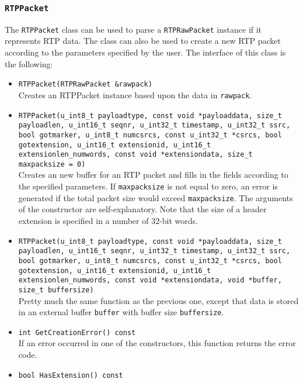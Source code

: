 \documentclass[12pt,a4paper]{article}
\newcommand{\headerfile}[1]{\marginpar{\scriptsize Header:\\{\tt #1}}}
\begin{document}
			\subsubsection{\tt RTPPacket}\headerfile{rtppacket.h}
	
				The {\tt RTPPacket} class can be used to parse a {\tt RTPRawPacket}
				instance if it represents RTP data. The class can also be used to
				create a new RTP packet according to the parameters specified by
				the user. The interface of this class is the following:
				\begin{itemize}
					\item {\tt RTPPacket(RTPRawPacket \&rawpack)}\\
						Creates an RTPPacket instance based upon the data in
						{\tt rawpack}.
					\item {\tt RTPPacket(u\_int8\_t payloadtype, const void *payloaddata, size\_t payloadlen, u\_int16\_t seqnr,
									u\_int32\_t timestamp, u\_int32\_t ssrc, bool gotmarker, u\_int8\_t numcsrcs, const u\_int32\_t *csrcs,
									bool gotextension, u\_int16\_t extensionid, u\_int16\_t extensionlen\_numwords, const void *extensiondata,
									size\_t maxpacksize = 0)}\\
						Creates an new buffer for an RTP packet and fills in the fields
						according to the specified parameters. If {\tt maxpacksize} is
						not equal to zero, an error is generated if the total packet size
						would exceed {\tt maxpacksize}. The arguments of the constructor
						are self-explanatory. Note that the size of a header extension is
						specified in a number of $32$-bit words.
					\item {\tt RTPPacket(u\_int8\_t payloadtype, const void *payloaddata, size\_t payloadlen, u\_int16\_t seqnr,
									u\_int32\_t timestamp, u\_int32\_t ssrc, bool gotmarker, u\_int8\_t numcsrcs, const u\_int32\_t *csrcs,
									bool gotextension, u\_int16\_t extensionid, u\_int16\_t extensionlen\_numwords, const void *extensiondata,
									void *buffer, size\_t buffersize)}\\
						Pretty much the same function as the previous one, except that data is stored
						in an external buffer {\tt buffer} with buffer size {\tt buffersize}.
					\item {\tt int GetCreationError() const}\\
						If an error occurred in one of the constructors, this function
						returns the error code.
					\item {\tt bool HasExtension() const}\\

\end{itemize}
\end{document}
